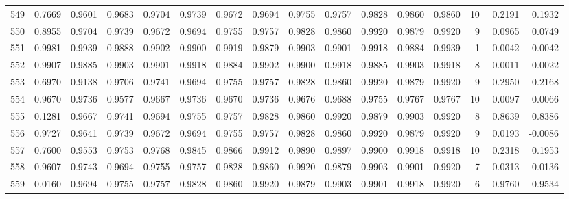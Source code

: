 \begin{tabular}{lrrrrrrrrrrrrrrr}
549 &      0.7669 &  0.9601 &  0.9683 &  0.9704 &  0.9739 &  0.9672 &  0.9694 &  0.9755 &  0.9757 &  0.9828 &   0.9860 &     0.9860 &     10 &                    0.2191 &                     0.1932 \\
550 &      0.8955 &  0.9704 &  0.9739 &  0.9672 &  0.9694 &  0.9755 &  0.9757 &  0.9828 &  0.9860 &  0.9920 &   0.9879 &     0.9920 &      9 &                    0.0965 &                     0.0749 \\
551 &      0.9981 &  0.9939 &  0.9888 &  0.9902 &  0.9900 &  0.9919 &  0.9879 &  0.9903 &  0.9901 &  0.9918 &   0.9884 &     0.9939 &      1 &                   -0.0042 &                    -0.0042 \\
552 &      0.9907 &  0.9885 &  0.9903 &  0.9901 &  0.9918 &  0.9884 &  0.9902 &  0.9900 &  0.9918 &  0.9885 &   0.9903 &     0.9918 &      8 &                    0.0011 &                    -0.0022 \\
553 &      0.6970 &  0.9138 &  0.9706 &  0.9741 &  0.9694 &  0.9755 &  0.9757 &  0.9828 &  0.9860 &  0.9920 &   0.9879 &     0.9920 &      9 &                    0.2950 &                     0.2168 \\
554 &      0.9670 &  0.9736 &  0.9577 &  0.9667 &  0.9736 &  0.9670 &  0.9736 &  0.9676 &  0.9688 &  0.9755 &   0.9767 &     0.9767 &     10 &                    0.0097 &                     0.0066 \\
555 &      0.1281 &  0.9667 &  0.9741 &  0.9694 &  0.9755 &  0.9757 &  0.9828 &  0.9860 &  0.9920 &  0.9879 &   0.9903 &     0.9920 &      8 &                    0.8639 &                     0.8386 \\
556 &      0.9727 &  0.9641 &  0.9739 &  0.9672 &  0.9694 &  0.9755 &  0.9757 &  0.9828 &  0.9860 &  0.9920 &   0.9879 &     0.9920 &      9 &                    0.0193 &                    -0.0086 \\
557 &      0.7600 &  0.9553 &  0.9753 &  0.9768 &  0.9845 &  0.9866 &  0.9912 &  0.9890 &  0.9897 &  0.9900 &   0.9918 &     0.9918 &     10 &                    0.2318 &                     0.1953 \\
558 &      0.9607 &  0.9743 &  0.9694 &  0.9755 &  0.9757 &  0.9828 &  0.9860 &  0.9920 &  0.9879 &  0.9903 &   0.9901 &     0.9920 &      7 &                    0.0313 &                     0.0136 \\
559 &      0.0160 &  0.9694 &  0.9755 &  0.9757 &  0.9828 &  0.9860 &  0.9920 &  0.9879 &  0.9903 &  0.9901 &   0.9918 &     0.9920 &      6 &                    0.9760 &                     0.9534 \\

\end{tabular}
